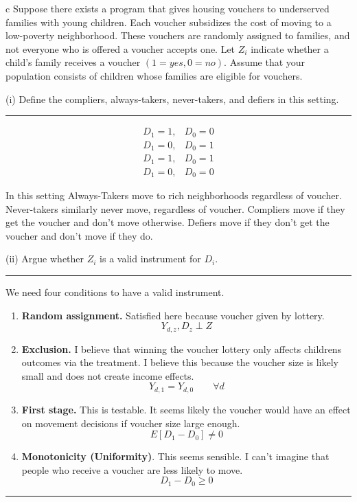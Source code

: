 \documentclass{article}
\begin{document}
\begin{problem}{c}
Suppose there exists a program
that gives housing vouchers to underserved families with young children.
Each voucher subsidizes the cost of moving to a low-poverty neighborhood.
These vouchers are randomly assigned to families, and not everyone
who is offered a voucher accepts one. Let $Z_{i}$ indicate whether
a child's family receives a voucher $(1=yes,0=no)$. Assume that your
population consists of children whose families are eligible for vouchers. 
\end{problem}


(i) Define the compliers, always-takers, never-takers, and defiers
in this setting. 

\rule[0.5ex]{1\columnwidth}{1pt}

\begin{align*}
D_{1}=1, & D_{0}=0\tag{compliers}\\
D_{1}=0, & D_{0}=1\tag{defiers}\\
D_{1}=1, & D_{0}=1\tag{always takers}\\
D_{1}=0, & D_{0}=0\tag{never takers}
\end{align*}

In this setting Always-Takers move to rich neighborhoods regardless
of voucher. Never-takers similarly never move, regardless of voucher.
Compliers move if they get the voucher and don't move otherwise. Defiers
move if they don't get the voucher and don't move if they do. 

(ii) Argue whether $Z_{i}$ is a valid instrument for $D_{i}$. 

\rule[0.5ex]{1\columnwidth}{1pt}

We need four conditions to have a valid instrument. 
\begin{enumerate}
\item \textbf{Random assignment.} Satisfied here because voucher given by
lottery.
\[
Y_{d,z},D_{z}\perp Z
\]
\item \textbf{Exclusion.} I believe that winning the voucher lottery only
affects childrens outcomes via the treatment. I believe this because
the voucher size is likely small and does not create income effects.
\[
Y_{d,1}=Y_{d,0}\qquad\forall d
\]
\item \textbf{First stage.} This is testable. It seems likely the voucher
would have an effect on movement decisions if voucher size large enough.
\[
E\left[D_{1}-D_{0}\right]\neq0
\]
\item \textbf{Monotonicity (Uniformity)}. This seems sensible. I can't imagine
that people who receive a voucher are less likely to move. 
\[
D_{1}-D_{0}\geq0
\]
\end{enumerate}
\rule[0.5ex]{1\columnwidth}{1pt}
\end{document}
